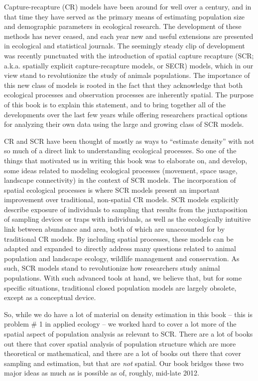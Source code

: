 

Capture-recapture (CR) models have been around for well
over a century, and in that time they have served as the primary means of
estimating population size and demographic parameters in ecological
research. The development of these methods has never ceased, and
each year new and useful extensions are presented in ecological and
statistical journals. The seemingly steady clip of development was
recently punctuated with the introduction of spatial capture
recapture (SCR; a.k.a.  spatially explicit capture-recapture models, or SECR)
 models, which in our view stand to revolutionize the
study of animals populations. The importance of this new class of
models is rooted in the fact that they acknowledge that both
ecological processes and observation processes are inherently
spatial. The purpose of this book is to explain this statement, and
to bring together all of the developments over the last few years
while offering researchers practical options for analyzing their own
data using the large and growing class of SCR models.

CR and SCR have been thought of mostly as ways to ``estimate density''
with not so much of a direct link to understanding ecological
processes. So one of the things that motivated us in writing this book
was to elaborate on, and develop, some ideas related to modeling
ecological processes (movement, space usage, landscape connectivity)
in the context of SCR models.  The incorporation of spatial ecological
processes is where SCR models present an important improvement over
traditional, non-spatial CR models.  SCR models explicitly describe
exposure of individuals to sampling that results from the
juxtaposition of sampling devices or traps with individuals, as well
as the ecologically intuitive link between abundance and area, both of
which are unaccounted for by traditional CR models. By including
spatial processes, these models can be adapted and expanded to
directly address many questions related to animal population and
landscape ecology, wildlife management and conservation.  As such, SCR
models stand to revolutionize how researchers study animal
populations.  With such advanced tools at hand, we believe that, but
for some specific situations, traditional closed population models are
largely obsolete, except as a conceptual device.

So, while we do have a lot of material on density estimation in this
book -- this is problem \# 1 in applied ecology -- we worked hard to
cover a lot more of the spatial aspect of population analysis as
relevant to SCR.  There are a lot of books out there that cover
spatial analysis of population structure which are more theoretical or
mathematical, and there are a lot of books out there that cover
sampling and estimation, but that are {\it not} spatial. Our book
bridges these two major ideas as much as is possible as of, roughly,
mid-late 2012.

